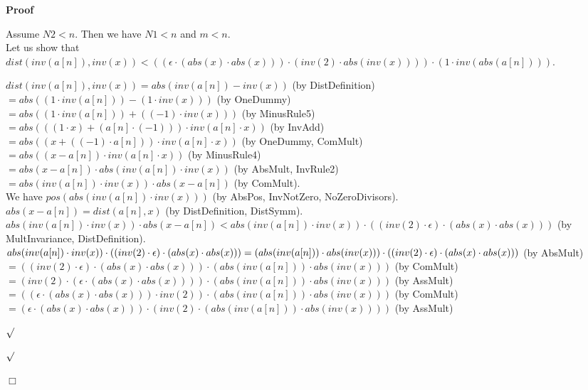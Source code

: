 \documentclass{article}
\newenvironment{forthel}{\begin{leftbar}}{\end{leftbar}}
\newenvironment{proof}{\noindent\textbf{Proof\ }}{\hspace*{\fill}$\Box$\medskip}
\newenvironment{subproof}{\begin{list}{}{}
		\item[\text{Proof}]}{\hfill $\surd$ \end{list}}
\newcommand{\dotequal}{=}
\begin{document}
\begin{forthel}
\begin{proof}
\begin{subproof}
	Assume $N2 < n$.
	Then we have $N1 < n$ and $m < n$.
	\\Let us show that $dist(inv(a[n]),inv(x)) < ((\epsilon \cdot (abs(x) \cdot abs(x))) \cdot (inv(2) \cdot abs(inv(x)))) \cdot (1 \cdot inv(abs(a[n])))$.
	\begin{subproof}
	$dist(inv(a[n]),inv(x)) \dotequal abs(inv(a[n]) - inv(x))$ (by DistDefinition)
	\\$\dotequal abs((1 \cdot inv(a[n])) - (1 \cdot inv(x)))$ (by OneDummy)
	\\$\dotequal abs((1 \cdot inv(a[n])) + ((-1) \cdot inv(x)))$ (by MinusRule5)
	\\$\dotequal abs(((1 \cdot x) + (a[n] \cdot (-1))) \cdot inv(a[n] \cdot x))$ (by InvAdd)
	\\$\dotequal abs((x + ((-1) \cdot a[n])) \cdot inv(a[n] \cdot x))$ (by OneDummy, ComMult)
	\\$\dotequal abs((x - a[n]) \cdot inv(a[n] \cdot x))$ (by MinusRule4)
	\\$\dotequal abs(x - a[n]) \cdot abs(inv(a[n]) \cdot inv(x))$ (by AbsMult, InvRule2)
	\\$\dotequal abs(inv(a[n]) \cdot inv(x)) \cdot abs(x - a[n])$ (by ComMult).
	\\We have $pos(abs(inv(a[n]) \cdot inv(x)))$ (by AbsPos, InvNotZero, NoZeroDivisors).
	\\$abs(x - a[n]) = dist(a[n],x)$ (by DistDefinition, DistSymm).
	\\$abs(inv(a[n]) \cdot inv(x)) \cdot abs(x - a[n]) < abs(inv(a[n]) \cdot inv(x)) \cdot ((inv(2) \cdot \epsilon) \cdot (abs(x) \cdot abs(x)))$ (by MultInvariance, DistDefinition).
	\\$abs(inv(a[n]) \cdot inv(x)) \cdot ((inv(2) \cdot \epsilon) \cdot (abs(x) \cdot abs(x))) \\ \dotequal (abs(inv(a[n])) \cdot abs(inv(x))) \cdot ((inv(2) \cdot \epsilon) \cdot (abs(x) \cdot abs(x)))$ (by AbsMult)
	\\$\dotequal ((inv(2) \cdot \epsilon) \cdot (abs(x) \cdot abs(x))) \cdot (abs(inv(a[n])) \cdot abs(inv(x)))$ (by ComMult)
	\\$\dotequal (inv(2) \cdot (\epsilon \cdot (abs(x) \cdot abs(x)))) \cdot (abs(inv(a[n])) \cdot abs(inv(x)))$ (by AssMult)
	\\$\dotequal ((\epsilon \cdot (abs(x) \cdot abs(x))) \cdot inv(2)) \cdot (abs(inv(a[n])) \cdot abs(inv(x)))$ (by ComMult) 
	\\$\dotequal (\epsilon \cdot (abs(x) \cdot abs(x))) \cdot (inv(2) \cdot (abs(inv(a[n])) \cdot abs(inv(x))))$ (by AssMult)

\end{subproof}
\end{subproof}
\end{proof}
\end{forthel}
\end{document}
